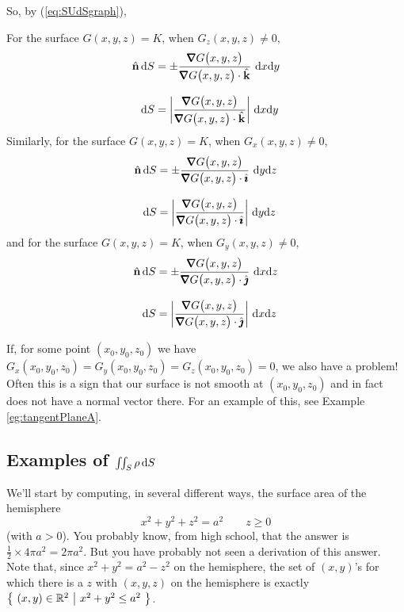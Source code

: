 So, by (\ref{eq:SUdSgraph}),
\begin{impeqn}\label{eq:SUdSimplicit}
For the surface $G(x,y,z)=K$, when $G_z(x,y,z)\ne 0$,
\begin{align*}
\hn\, \dee{S} & = 
    \pm\frac{\vnabla G\big(x,y,z\big)}{\vnabla G\big(x,y,z\big)\cdot\hk}\ 
          \dee{x}\dee{y} \\[0.1in]
\dee{S}&= 
\bigg|\frac{\vnabla G\big(x,y,z\big)}{\vnabla G\big(x,y,z\big)\cdot\hk}\bigg|\ 
          \dee{x}\dee{y}
\end{align*}
Similarly, for the surface $G(x,y,z)=K$, when $G_x(x,y,z)\ne 0$,
\begin{align*}
\hn\, \dee{S} & = 
    \pm\frac{\vnabla G\big(x,y,z\big)}{\vnabla G\big(x,y,z\big)\cdot\hi}\ 
          \dee{y}\dee{z} \\[0.1in]
\dee{S}&= 
\bigg|\frac{\vnabla G\big(x,y,z\big)}{\vnabla G\big(x,y,z\big)\cdot\hi}\bigg|\ 
          \dee{y}\dee{z}
\end{align*}
and for the surface $G(x,y,z)=K$, when $G_y(x,y,z)\ne 0$,
\begin{align*}
\hn\, \dee{S} & = 
    \pm\frac{\vnabla G\big(x,y,z\big)}{\vnabla G\big(x,y,z\big)\cdot\hj}\ 
          \dee{x}\dee{z} \\[0.1in]
\dee{S}&= 
\bigg|\frac{\vnabla G\big(x,y,z\big)}{\vnabla G\big(x,y,z\big)\cdot\hj}\bigg|\ 
          \dee{x}\dee{z}
\end{align*}

\end{impeqn}
\noindent
If, for some point $(x_0,y_0,z_0)$ we have 
$G_x(x_0,y_0,z_0)= 
 G_y(x_0,y_0,z_0)= 
 G_z(x_0,y_0,z_0)= 0$, we also have a problem! Often this is a sign
that our surface is not smooth at $(x_0,y_0,z_0)$ and in fact does not
have a normal vector there. For an example of this, see 
Example \ref{eg:tangentPlaneA}.


\subsection{Examples of $\iint_S \rho\,\mathrm{d}S$}\label{sec:rhodSexamples}
We'll start by computing, in several different ways, the surface area of the 
hemisphere
\begin{equation*}
x^2+y^2+z^2=a^2\qquad z\ge 0
\end{equation*}
(with $a>0$).
You probably know, from high school, that the answer is 
$\frac{1}{2}\times 4\pi a^2=2\pi a^2$. But you have probably 
not seen a derivation of this answer.
Note that, since $x^2+y^2 = a^2-z^2$ on the hemisphere, the set
of $(x,y)$'s for which there is a $z$ with $(x,y,z)$ on the  hemisphere
is exactly $\big\{ \ (x,y)\in\mathbb{R}^2\ \big|\ x^2+y^2\le a^2\ \big\}$.

